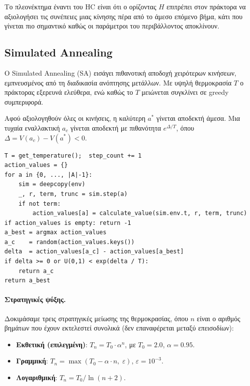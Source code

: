 \documentclass[12pt,a4paper]{article}
\begin{document}
Το πλεονέκτημα έναντι του \textlatin{HC} είναι ότι ο ορίζοντας $H$ επιτρέπει στον
πράκτορα να αξιολογήσει τις συνέπειες μιας κίνησης πέρα από το άμεσο επόμενο βήμα,
κάτι που γίνεται πιο σημαντικό καθώς οι παράμετροι του περιβάλλοντος αποκλίνουν.

\subsection{\textlatin{Simulated Annealing}}

Ο \textlatin{Simulated Annealing} (\textlatin{SA}) εισάγει πιθανοτική αποδοχή χειρότερων
κινήσεων, εμπνευσμένος από τη διαδικασία ανόπτησης μετάλλων. Με υψηλή
θερμοκρασία $T$ ο πράκτορας εξερευνά ελεύθερα, ενώ καθώς το $T$ μειώνεται συγκλίνει
σε \textlatin{greedy} συμπεριφορά.

Αφού αξιολογηθούν όλες οι κινήσεις, η καλύτερη $a^*$ γίνεται αποδεκτή άμεσα. Μια
τυχαία εναλλακτική $a_c$ γίνεται αποδεκτή με πιθανότητα $e^{\Delta/T}$, όπου
$\Delta = V(a_c) - V(a^*) < 0$.

\begin{lstlisting}[language={}, caption={\textlatin{Simulated Annealing -- act(env)}}]
T = get_temperature();  step_count += 1
action_values = {}
for a in {0, ..., |A|-1}:
    sim = deepcopy(env)
    _, r, term, trunc = sim.step(a)
    if not term:
        action_values[a] = calculate_value(sim.env.t, r, term, trunc)
if action_values is empty: return -1
a_best = argmax action_values
a_c    = random(action_values.keys())
delta  = action_values[a_c] - action_values[a_best]
if delta >= 0 or U(0,1) < exp(delta / T):
    return a_c
return a_best
\end{lstlisting}

\paragraph{Στρατηγικές ψύξης.}
Δοκιμάσαμε τρεις στρατηγικές μείωσης της θερμοκρασίας, όπου $n$ είναι ο
αριθμός βημάτων που έχουν εκτελεστεί συνολικά (δεν επαναφέρεται μεταξύ επεισοδίων):

\begin{itemize}
    \item \textbf{Εκθετική (επιλεγμένη)}: $T_n = T_0 \cdot \alpha^n$, με $T_0 = 2.0$, $\alpha = 0.95$.
    \item \textbf{Γραμμική}: $T_n = \max(T_0 - \alpha \cdot n,\; \varepsilon)$, $\varepsilon = 10^{-3}$.
    \item \textbf{Λογαριθμική}: $T_n = T_0 / \ln(n + 2)$.
\end{itemize}
\end{document}
